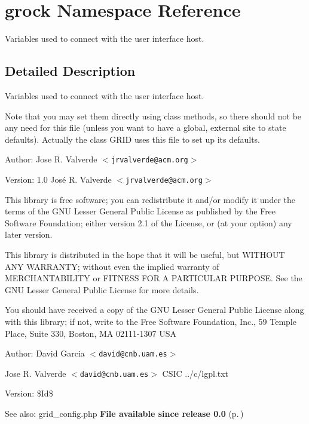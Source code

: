 \section{grock Namespace Reference}
\label{namespacegrock}
Variables used to connect with the user interface host.  




\subsection{Detailed Description}
Variables used to connect with the user interface host. 

Note that you may set them directly using class methods, so there should not be any need for this file (unless you want to have a global, external site to state defaults). Actually the class GRID uses this file to set up its defaults.

\begin{Desc}
\item[Author:]Jose R. Valverde $<${\tt jrvalverde@acm.org}$>$ \end{Desc}
\begin{Desc}
\item[Version:]1.0  Jos\'{e} R. Valverde $<${\tt jrvalverde@acm.org}$>$\end{Desc}
This library is free software; you can redistribute it and/or modify it under the terms of the GNU Lesser General Public License as published by the Free Software Foundation; either version 2.1 of the License, or (at your option) any later version.

This library is distributed in the hope that it will be useful, but WITHOUT ANY WARRANTY; without even the implied warranty of MERCHANTABILITY or FITNESS FOR A PARTICULAR PURPOSE. See the GNU Lesser General Public License for more details.

You should have received a copy of the GNU Lesser General Public License along with this library; if not, write to the Free Software Foundation, Inc., 59 Temple Place, Suite 330, Boston, MA 02111-1307 USA

\begin{Desc}
\item[Author:]David Garcia $<${\tt david@cnb.uam.es}$>$ 

Jose R. Valverde $<${\tt david@cnb.uam.es}$>$  CSIC  ../c/lgpl.txt \end{Desc}
\begin{Desc}
\item[Version:]\$Id\$ \end{Desc}
\begin{Desc}
\item[See also:]grid\_\-config.php {\bf File available since release 0.0 }{\rm (p.\,\pageref{})}\end{Desc}



